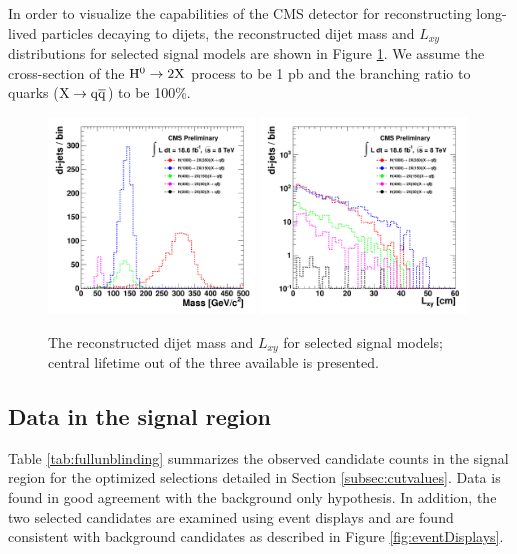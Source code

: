In order to visualize the capabilities of the CMS detector for reconstructing long-lived particles decaying to 
dijets, 
the reconstructed dijet mass and $L_{xy}$ distributions for selected signal models are shown in Figure
\ref{fig:signal}. We assume the cross-section of the $\mathrm{H}^{0}\rightarrow2\mathrm{X}$ process to be 1 pb and the branching 
ratio to quarks ($\mathrm{X}\rightarrow\mathrm{q}\overline{\mathrm{q}}$) to be 100\%.

\begin{figure}[htbp]
\centering
\includegraphics[width=0.49\textwidth]{plots/signal/mass.pdf}
\includegraphics[width=0.49\textwidth]{plots/signal/Lxy.pdf}
\caption{The reconstructed dijet mass and $L_{xy}$ for selected signal models; central lifetime out of the three available is presented.\label{fig:signal}}
\end{figure}

\subsection{Data in the signal region}
\label{subsec:fullunblinding}

Table \ref{tab:fullunblinding} summarizes the observed candidate counts in the signal region for the optimized 
selections detailed in Section \ref{subsec:cutvalues}. Data is found in good agreement with the 
background only hypothesis. In addition, the two selected candidates are examined using event displays
and are found consistent with background candidates as described in Figure \ref{fig:eventDisplays}.  

